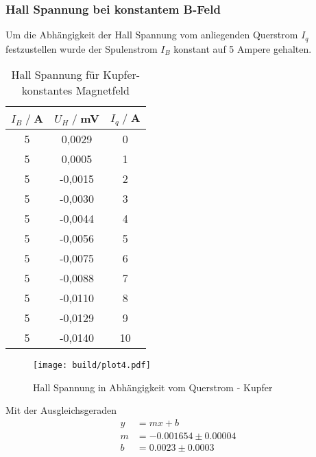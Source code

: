 \subsubsection{Hall Spannung bei konstantem B-Feld}
Um die Abhängigkeit der Hall Spannung vom anliegenden Querstrom $I_q$ festzustellen wurde der Spulenstrom $I_B$ konstant auf 5 Ampere gehalten.
\begin{table}[H]
    \centering
    \begin{tabular}{c c c}
        \toprule
        $I_B \;/\;$A & $U_H\;/\;$mV & $I_q \;/\;$A\\
        \midrule
            5                   & 0,0029&             0\\
            5                   & 0,0005&             1\\
            5                   &-0,0015&             2\\
            5                   &-0,0030&             3\\
            5                   &-0,0044&             4\\
            5                   &-0,0056&             5\\
            5                   &-0,0075&             6\\
            5                   &-0,0088&             7\\
            5                   &-0,0110&             8\\
            5                   &-0,0129&             9\\
            5                   &-0,0140&             10\\
        \bottomrule
    \end{tabular}
    \caption{Hall Spannung für Kupfer- konstantes Magnetfeld}
    \label{tab:Cu_I}
\end{table}
\begin{figure}[H]
    \centering
    \texttt{[image: build/plot4.pdf]}
    \caption{Hall Spannung in Abhängigkeit vom Querstrom - Kupfer}
    \label{fig:Cu_I}
\end{figure}
Mit der Ausgleichsgeraden
\begin{align*}
    y &= mx + b\\
    m &= -0.001654\pm 0.00004\\  
    b &=  0.0023\pm 0.0003\\
\end{align*}

